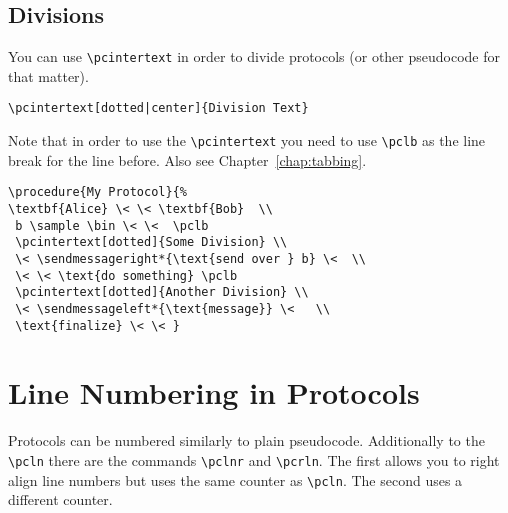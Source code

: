 \documentclass[a4paper]{report}
\begin{document}
\subsection{Divisions}
You can use \lstinline$\pcintertext$ in order to divide protocols (or other pseudocode for that matter).
\begin{lstlisting}
\pcintertext[dotted|center]{Division Text}
\end{lstlisting}
Note that in order to use the \lstinline$\pcintertext$ you need to use \lstinline$\pclb$ as the line break for the line
before. Also see Chapter~\ref{chap:tabbing}.

\begin{center}
\end{center}

\begin{lstlisting}
\procedure{My Protocol}{%
\textbf{Alice} \< \< \textbf{Bob}  \\
 b \sample \bin \< \<  \pclb
 \pcintertext[dotted]{Some Division} \\
 \< \sendmessageright*{\text{send over } b} \<  \\
 \< \< \text{do something} \pclb
 \pcintertext[dotted]{Another Division} \\
 \< \sendmessageleft*{\text{message}} \<   \\
 \text{finalize} \< \< }
\end{lstlisting}



\section{Line Numbering in Protocols}
Protocols can be numbered similarly to plain pseudocode. Additionally to the \lstinline$\pcln$ there are the commands \lstinline$\pclnr$ and \lstinline$\pcrln$. The first
allows you to right align line numbers but uses the same counter as \lstinline$\pcln$. The second uses a different counter.
\end{document}
